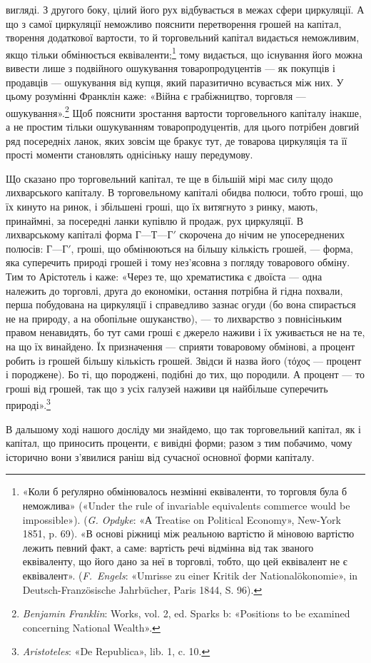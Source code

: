 \parcont{}  %
вигляді. З другого боку, цілий його рух відбувається в межах
сфери циркуляції. А що з самої циркуляції неможливо пояснити
перетворення грошей на капітал, творення додаткової вартости,
то й торговельний капітал видається неможливим, якщо тільки
обмінюється еквіваленти;\footnote{
«Коли б реґулярно обмінювалось незмінні еквіваленти, то торговля
була б неможлива» («Under the rule of invariable equivalents commerce
would be impossible»). (\emph{G. Opdyke}: «А Treatise on Political Economy»,
New-York 1851, p. 69). «В основі ріжниці між реальною вартістю й
міновою вартістю лежить певний факт, а саме: вартість речі відмінна
від так званого еквіваленту, що його дано за неї в торговлі, тобто, що
цей еквівалент не є еквівалент». (\emph{F.~Engels}: «Umrisse zu einer Kritik
der Nationalökonomie», in Deutsch-Französische Jahrbücher, Paris 1844,
S. 96).
} тому видається, що існування його
можна вивести лише з подвійного ошукування товаропродуцентів —
як покупців і продавців — ошукування від купця, який паразитично
всувається між них. У цьому розумінні Франклін каже:
«Війна є грабіжництво, торговля — ошукування».\footnote{
\emph{Benjamin Franklin}: Works, vol. 2, ed. Sparks b: «Positions to be
examined concerning National Wealth».
} Щоб пояснити
зростання вартости торговельного капіталу інакше, а не
простим тільки ошукуванням товаропродуцентів, для цього потрібен
довгий ряд посередніх ланок, яких зовсім ще бракує тут,
де товарова циркуляція та її прості моменти становлять однісіньку
нашу передумову.

Що сказано про торговельний капітал, те ще в більшій мірі
має силу щодо лихварського капіталу. В торговельному капіталі
обидва полюси, тобто гроші, що їх кинуто на ринок, і збільшені
гроші, що їх витягнуто з ринку, мають, принаймні, за посередні
ланки купівлю й продаж, рух циркуляції. В лихварському капіталі
форма $Г — Т — Г'$ скорочена до нічим не упосереднених полюсів:
$Г — Г'$, гроші, що обмінюються на більшу кількість грошей, —
форма, яка суперечить природі грошей і тому нез’ясовна з погляду
товарового обміну. Тим то Арістотель і каже: «Через те,
що хрематистика є двоїста — одна належить до торговлі, друга до
економіки, остання потрібна й гідна похвали, перша побудована
на циркуляції і справедливо зазнає огуди (бо вона спирається не
на природу, а на обопільне ошуканство), — то лихварство з повнісіньким
правом ненавидять, бо тут сами гроші є джерело наживи
і їх уживається не на те, на що їх винайдено. Їх призначення —
сприяти товаровому обмінові, а процент робить із грошей більшу
кількість грошей. Звідси й назва його (\textgreek{τόχος} — процент і породжене).
Бо ті, що породжені, подібні до тих, що породили. А процент
— то гроші від грошей, так що з усіх галузей наживи ця
найбільше суперечить природі».\footnote{
\emph{Aristoteles}: «De Republica», lib. 1, c. 10.
}

В дальшому ході нашого досліду ми знайдемо, що так торговельний
капітал, як і капітал, що приносить проценти, є вивідні
форми; разом з тим побачимо, чому історично вони з’явилися
раніш від сучасної основної форми капіталу.
